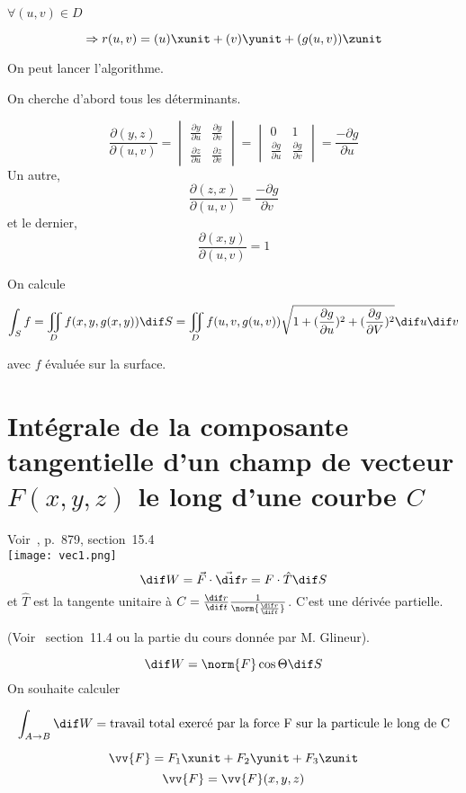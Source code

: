 $\forall (u,v) \in D $


\[\Rightarrow r (u,v) = (u)\xunit+(v)\yunit+(g(u,v))\zunit\]

On peut lancer l'algorithme.

On cherche d'abord tous les déterminants.

\[\frac{\partial (y,z)}{\partial (u,v)} =
\begin{vmatrix}
\frac{\partial y}{\partial u}& \frac{\partial y}{\partial v}\\
\frac{\partial z}{\partial u}& \frac{\partial z}{\partial v}
\end{vmatrix} =
\begin{vmatrix}
0&1\\
\frac{\partial g}{\partial u}&\frac{\partial g}{\partial v}
\end{vmatrix}
= \frac{-\partial g}{\partial u}\]
Un autre,
\[\frac{\partial (z,x)}{\partial (u,v)} = \frac{-\partial g}{\partial v}\]
et le dernier,
\[\frac{\partial (x,y)}{\partial (u,v)} = 1\]

On calcule

\[\int_S f = \iint_D f(x,y,g(x,y)) \dif S = \iint_D f(u,v,g(u,v))\sqrt{1+(\frac{\partial g}{\partial u})^2 +(\frac{\partial g}{\partial V})^2 } \dif u\dif v
\]

avec $f$ évaluée sur la surface.

\section{Intégrale de la composante tangentielle d'un champ de vecteur $F(x,y,z)$ le long d'une courbe $C$}

Voir~\cite{adams2013calculus}, p.~879, section~15.4\\


\texttt{[image: vec1.png]}\\

\[\dif W = \vec F\cdot \vec \dif r = F\cdot \hat{T} \dif S\]
et $\hat{T}$ est la tangente unitaire à $C=\frac{\dif r}{\dif t}\frac{1}{\norm{\frac{\dif r}{\dif t}}}$. C'est une dérivée partielle.

(Voir~\cite{adams2013calculus} section~11.4 ou la partie du cours donnée par M. Glineur).

\[\dif W = \norm{F} \cos \Theta \dif S\]
On souhaite calculer

\[\int_{A\to B} \dif W = \text{travail total exercé par la force F sur la particule le long de C}\]


\[\vv{F}=F_1 \xunit + F_2 \yunit +F_3 \zunit\]
\[\vv{F} = \vv{F}(x,y,z)\]

